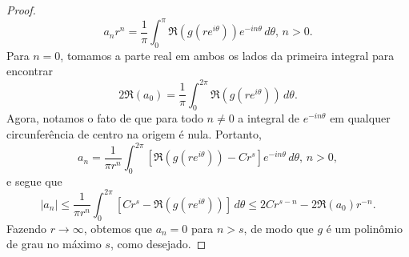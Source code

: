 \begin{proof}
        \begin{equation*}
            a_n r^n = \frac{1}{\pi} \int_0^{\pi} \Re(g(re^{i\theta}))e^{-in\theta} \, d\theta,
            \, n > 0.
        \end{equation*}
        Para $n = 0$, tomamos a parte real em ambos os lados da primeira integral para encontrar
        \begin{equation*}
            2\Re(a_0) = \frac{1}{\pi}\int_0^{2\pi} \Re(g(re^{i\theta})) \, d\theta.
        \end{equation*}
        Agora, notamos o fato de que para todo $n\neq 0$ a integral de $e^{-in\theta}$
        em qualquer circunferência de centro na origem é nula. Portanto,
        \begin{equation*}
            a_n 
            = 
            \frac{1}{\pi r^n} \int_0^{2\pi} \left[ \Re(g(re^{i\theta})) - Cr^s \right]e^{-in\theta}
            \, d\theta, \, n > 0,
        \end{equation*}
        e segue que
        \begin{equation*}
            |a_n| 
            \leq
            \frac{1}{\pi r^n} 
            \int_0^{2\pi} \left[ Cr^s - \Re(g(re^{i\theta})) \right] \, d\theta
            \leq
            2Cr^{s-n} - 2\Re(a_0)r^{-n}.
        \end{equation*}
        Fazendo $r\to\infty$, obtemos que $a_n = 0$ para $n > s$, de modo que $g$
        é um polinômio de grau no máximo $s$, como desejado.
    \end{proof}
    
    \medskip
    
